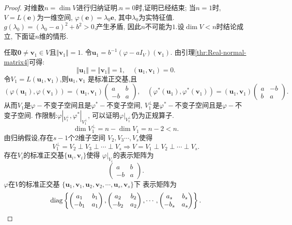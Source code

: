 \begin{proof}
  对维数$n=\dim V$进行归纳证明.$n=0$时,证明已经结束;
  当$n=1$时,$V=L(\bm{e})$为一维空间,
  $\varphi(\bm{e})=\lambda_0\bm{e}$,
  其中$\lambda_0$为实特征值.
  $g(\lambda_0)=(\lambda_0-a)^2+b^2>0$,产生矛盾,
  因此$n$不可能为$1$.设$\dim V<n$时结论成立,
  下面证$n$维的情形.

  任取$\bm{0}\neq \bm{v}_1\in V$且$\Vert\bm{v}_1\Vert=1$.
  令$\bm{u}_1=b^{-1}(\varphi-aI_V)(\bm{v}_1)$.
  由引理\ref{thr:Real-normal-matrix4}可得:
  \[
    \Vert\bm{u}_1\Vert=\Vert\bm{v}_1\Vert=1, \quad
    (\bm{u}_1,\bm{v}_1)=0.
  \]
  令$V_1=L(\bm{u}_1,\bm{v}_1)$,则$\bm{u}_1,\bm{v}_1$
  是标准正交基,且
  \[
    (\varphi(\bm{u}_1),\varphi(\bm{v}_1))=(\bm{u}_1,\bm{v}_1)\begin{pmatrix}
      a & b\\
      -b & a
    \end{pmatrix},\quad
    (\varphi^*(\bm{u}_1),\varphi^*(\bm{v}_1))=(\bm{u}_1,\bm{v}_1)\begin{pmatrix}
      a & -b\\
      b & a
    \end{pmatrix}.
  \]
  从而$V_1$是$\varphi-$不变子空间且是$\varphi^*-$不变子空间,
  $V_1^{\perp}$是$\varphi^*-$不变子空间且是$\varphi-$不变子空间.
  作限制:$\varphi|_{V_1^{\perp}}, \varphi^*|_{V_1^{\perp}}$,
  可以证明$\varphi|_{V_1^{\perp}}$仍为正规算子.
  \[
    \dim V_1^{\perp}=n-\dim V_1=n-2<n.
  \]
  由归纳假设,存在$s-1$个$2$维子空间
  $V_2,V_3\cdots,V_s$使得
  \[
    V_1^{\perp}=V_2\perp V_3\perp\cdots\perp V_s\Longrightarrow
    V=V_1\perp V_2\perp\cdots\perp V_s.
  \]
  存在$V_i$的标准正交基$\{\bm{u}_i,\bm{v}_i\}$使得
  $\varphi|_{V_i}$的表示矩阵为
  \[
    \begin{pmatrix}
      a & b\\
      -b  & a
    \end{pmatrix}.
  \]
  $\varphi$在$V$的标准正交基
  $\{\bm{u}_1,\bm{v}_1,\bm{u}_2,\bm{v}_2,\cdots,\bm{u}_s,\bm{v}_s\}$下
  表示矩阵为
  \[
    \operatorname{diag}\left\{
    \begin{pmatrix}
      a_1&b_1\\
      -b_1&a_1
    \end{pmatrix},
    \begin{pmatrix}
      a_2&b_2\\
      -b_2&a_2
    \end{pmatrix},\cdots,
    \begin{pmatrix}
      a_s&b_s\\
      -b_s&a_s
    \end{pmatrix}
    \right\}.
  \]
\end{proof}

